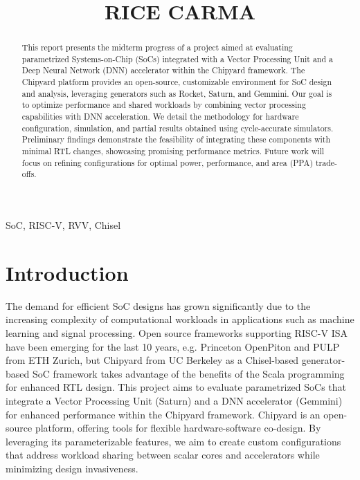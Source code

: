 \documentclass[conference]{IEEEtran}
\begin{document}
\title{RICE CARMA\\

}

\author{
}

\maketitle

\begin{abstract}
This report presents the midterm progress of a project aimed at evaluating parametrized Systems-on-Chip (SoCs) integrated with a Vector Processing Unit and a Deep Neural Network (DNN) accelerator within the Chipyard framework. The Chipyard platform provides an open-source, customizable environment for SoC design and analysis, leveraging generators such as Rocket, Saturn, and Gemmini. Our goal is to optimize performance and shared workloads by combining vector processing capabilities with DNN acceleration. We detail the methodology for hardware configuration, simulation, and partial results obtained using cycle-accurate simulators. Preliminary findings demonstrate the feasibility of integrating these components with minimal RTL changes, showcasing promising performance metrics. Future work will focus on refining configurations for optimal power, performance, and area (PPA) trade-offs.
\end{abstract}

\begin{IEEEkeywords}
SoC, RISC-V, RVV, Chisel
\end{IEEEkeywords}

\section{Introduction}
The demand for efficient SoC designs has grown significantly due to the increasing complexity of computational workloads in applications such as machine learning and signal processing. Open source frameworks supporting RISC-V ISA have been emerging for the last 10 years, e.g. Princeton OpenPiton and PULP from ETH Zurich, but Chipyard from UC Berkeley as a Chisel-based generator-based SoC framework takes advantage of the benefits of the Scala programming for enhanced RTL design. This project aims to evaluate parametrized SoCs that integrate a Vector Processing Unit (Saturn) and a DNN accelerator (Gemmini) for enhanced performance within the Chipyard framework. Chipyard is an open-source platform, offering tools for flexible hardware-software co-design. By leveraging its parameterizable features, we aim to create custom configurations that address workload sharing between scalar cores and accelerators while minimizing design invasiveness. 
\end{document}
